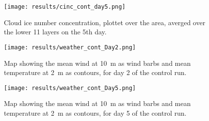 \begin{figure}
\centering
\texttt{[image: results/cinc\_cont\_day5.png]}
\caption{Cloud ice number concentration, plottet over the area, averged over the lower 11 layers on the 5th day.}
\label{fig:cinc_cont_Day5}
\end{figure}

\begin{figure}
\centering
\texttt{[image: results/weather\_cont\_Day2.png]}
\caption{Map showing the mean wind at 10~m as wind barbs and mean temperature at 2~m as contours, for day 2 of the control run.}
\label{fig:weather_cont_Day2}
\end{figure}

\begin{figure}
\centering
\texttt{[image: results/weather\_cont\_Day5.png]}
\caption{Map showing the mean wind at 10~m as wind barbs and mean temperature at 2~m as contours, for day 5 of the control run.}
\label{fig:weather_cont_Day5}
\end{figure}


